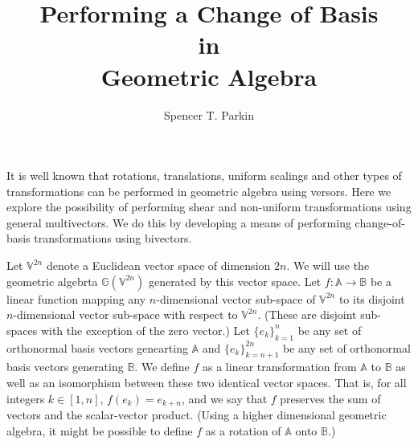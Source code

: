 \documentclass[12pt]{article}
\title{Performing a Change of Basis\\in\\Geometric Algebra}
\author{Spencer T. Parkin}
\newcommand{\G}{\mathbb{G}}
\newcommand{\V}{\mathbb{V}}
\newcommand{\A}{\mathbb{A}}
\newcommand{\B}{\mathbb{B}}
\begin{document}
\maketitle

It is well known that rotations, translations, uniform scalings and other types of transformations
can be performed in geometric algebra using versors.  Here we explore the possibility
of performing shear and non-uniform transformations using general multivectors.  We do this
by developing a means of performing change-of-basis transformations using bivectors.

Let $\V^{2n}$ denote a Euclidean vector space of dimension $2n$.  We will use the
geometric algebrta $\G(\V^{2n})$ generated by this vector space.  Let $f:\A\to\B$ be a linear
function mapping any $n$-dimensional vector sub-space of $\V^{2n}$ to its disjoint
$n$-dimensional vector sub-space with respect to $\V^{2n}$.  (These are disjoint sub-spaces with the exception
of the zero vector.)  Let $\{e_k\}_{k=1}^n$ be any set of orthonormal basis vectors genearting $\A$
and $\{e_k\}_{k=n+1}^{2n}$ be any set of orthonormal basis vectors generating $\B$.  We define
$f$ as a linear transformation from $\A$ to $\B$ as well as an isomorphism between these two identical
vector spaces.  That is, for all integers $k\in[1,n]$, $f(e_k)=e_{k+n}$, and we say that
$f$ preserves the sum of vectors and the scalar-vector product.
(Using a higher dimensional geometric
algebra, it might be possible to define $f$ as a rotation of $\A$ onto $\B$.)
\end{document}
